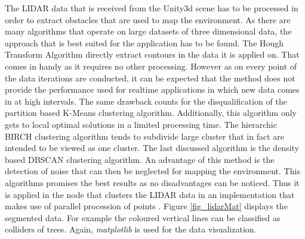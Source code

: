 The \ac{LIDAR} data that is received from the Unity3d scene has to be processed in order to extract obstacles that are used to map the environment. As there are many algorithms that operate on large datasets of three dimensional data, the approach that is best suited for the application has to be found. The Hough Transform Algorithm directly extract contours in the data it is applied on. That comes in handy as it requires no other processing. However as on every point of the data iterations are conducted, it can be expected that the method does not provide the performance used for realtime applications in which new data comes in at high intervals. The same drawback counts for the disqualification of the partition based K-Means clustering algorithm. Additionally, this algorithm only gets to local optimal solutions in a limited processing time. The hierarchic \ac{BIRCH} clustering algorithm tends to subdivide large cluster that in fact are intended to be viewed as one cluster. The last discussed algorithm is the density based \ac{DBSCAN} clustering algorithm. An advantage of this method is the detection of noise that can then be neglected for mapping the environment. This algorithms promises the best results as no disadvantages can be noticed. Thus it is applied in the node that clusters the \ac{LIDAR} data in an implementation that makes use of parallel procession of points \cite{ParaDBSCAN}. Figure \ref{fig_lidarMat} displays the segmented data. For example the coloured vertical lines can be classified as colliders of trees. Again, \textit{matplotlib} is used for the data visualization.\\
